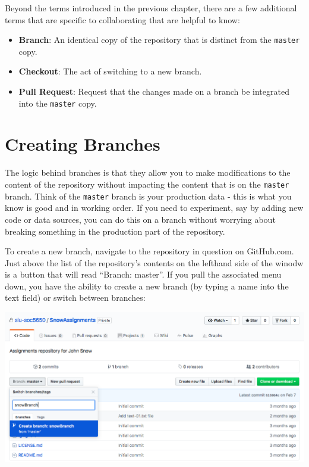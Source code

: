 \documentclass[]{book}
\providecommand{\tightlist}{%
  \setlength{\itemsep}{0pt}\setlength{\parskip}{0pt}}
\theoremstyle{definition}
\theoremstyle{definition}
\theoremstyle{definition}
\theoremstyle{remark}
\begin{document}
Beyond the terms introduced in the previous chapter, there are a few
additional terms that are specific to collaborating that are helpful to
know:

\begin{itemize}
\tightlist
\item
  \textbf{Branch}: An identical copy of the repository that is distinct
  from the \texttt{master} copy.
\item
  \textbf{Checkout}: The act of switching to a new branch.
\item
  \textbf{Pull Request}: Request that the changes made on a branch be
  integrated into the \texttt{master} copy.
\end{itemize}

\section{Creating Branches}\label{creating-branches}

The logic behind branches is that they allow you to make modifications
to the content of the repository without impacting the content that is
on the \texttt{master} branch. Think of the \texttt{master} branch is
your production data - this is what you know is good and in working
order. If you need to experiment, say by adding new code or data
sources, you can do this on a branch without worrying about breaking
something in the production part of the repository.

To create a new branch, navigate to the repository in question on
GitHub.com. Just above the list of the repository's contents on the
lefthand side of the winodw is a button that will read ``Branch:
master''. If you pull the associated menu down, you have the ability to
create a new branch (by typing a name into the text field) or switch
between branches:

\includegraphics[width=1\linewidth]{images/branch1}
\end{document}
